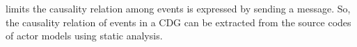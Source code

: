 limits the causality relation among events is expressed by sending a message. So, the causality relation of events in a CDG can be extracted from the source codes of actor models using static analysis. 

